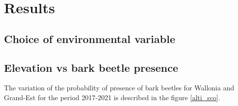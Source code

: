 \documentclass[3p,procedia]{elsarticle}
\begin{document}




	






\section{Results}

\subsection{Choice of environmental variable}




\subsection{ Elevation vs bark beetle presence}
The variation of the probability of presence of bark beetles for Wallonia and Grand-Est for the period 2017-2021 is described in the figure 
\ref{alti_sco}.
\end{document}
